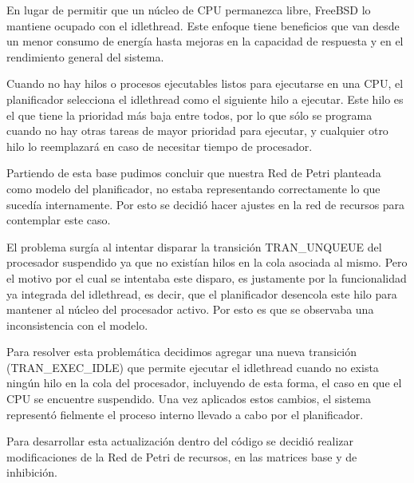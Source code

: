 En lugar de permitir que un núcleo de CPU permanezca libre, FreeBSD lo mantiene ocupado con el idlethread. Este enfoque tiene beneficios que van desde un menor consumo de energía hasta mejoras en la capacidad de respuesta y en el rendimiento general del sistema.\par

Cuando no hay hilos o procesos ejecutables listos para ejecutarse en una CPU, el planificador selecciona el idlethread como el siguiente hilo a ejecutar. Este hilo es el que  tiene la prioridad más baja entre todos, por lo que sólo se programa cuando no hay otras tareas de mayor prioridad para ejecutar, y cualquier otro hilo lo reemplazará en caso de necesitar tiempo de procesador.\par

Partiendo de esta base pudimos concluir que nuestra Red de Petri planteada como modelo del planificador, no estaba representando correctamente lo que sucedía internamente. Por esto se decidió hacer ajustes en la red de recursos para contemplar este caso.\par

El problema surgía al intentar disparar la transición TRAN\_UNQUEUE del procesador suspendido ya que no existían hilos en la cola asociada al mismo. Pero el motivo por el cual se intentaba este disparo, es justamente por la funcionalidad ya integrada del idlethread, es decir, que el planificador desencola este hilo para mantener al núcleo del procesador activo. Por esto es que se observaba una inconsistencia con el modelo.\par

Para resolver esta problemática decidimos agregar una nueva transición (TRAN\_EXEC\_IDLE) que permite ejecutar el idlethread cuando no exista ningún hilo en la cola del procesador, incluyendo de esta forma, el caso en que el CPU se encuentre suspendido. Una vez aplicados estos cambios, el sistema representó fielmente el proceso interno llevado a cabo por el planificador.\par


Para desarrollar esta actualización dentro del código se decidió realizar modificaciones de la Red de Petri de recursos, en las matrices base y de inhibición.\par

